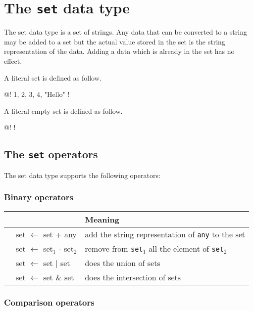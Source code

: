 \documentclass[10pt,openright,twosides,final]{memoir}
\newcommand{\gtltype}[1]{{\small\ttfamily #1}}
\begin{document}
\section{The \texttt{set} data type}

The \gtltype{set} data type is a set of strings. Any data that can be converted to a string may be added to a set but the actual value stored in the set is the string representation of the data. Adding a data which is already in the set has no effect.

A literal set is defined as follow.

\begin{gtl}
@! 1, 2, 3, 4, "Hello" !
\end{gtl}

A literal empty set is defined as follow.

\begin{gtl}
@! !
\end{gtl}

\subsection{The \texttt{set} operators}

The \gtltype{set} data type supports the following operators:

\subsubsection{Binary operators}

\begin{longtable}{>{\ttfamily}l|>{\ttfamily}l|l}
{\bfseries Operator}&{\bfseries Expression type}&{\bfseries Meaning}\\
\hline\endhead
 {+}&
  {set $\leftarrow$ set + any}&
  {add the string representation of \texttt{any} to the set}\\
 {-}&
  {set $\leftarrow$ set$_1$ - set$_2$}&
  {remove from \texttt{set$_1$} all the element of \texttt{set$_2$}}\\
 {|}&
  {set $\leftarrow$ set | set}&
  {does the union of sets}\\
 {\&}&
  {set $\leftarrow$ set \& set}&
  {does the intersection of sets}\\
\end{longtable}

\subsubsection{Comparison operators}
\end{document}
